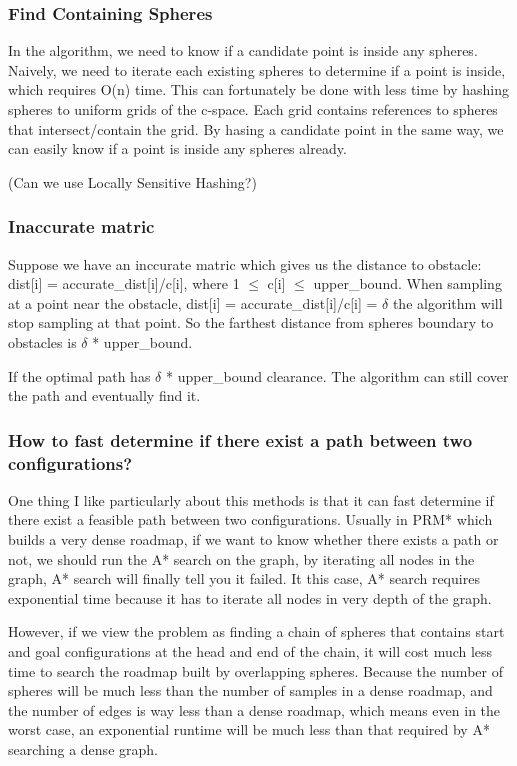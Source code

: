 \documentclass{article}
\begin{document}
 		\subsubsection{Find Containing Spheres}
 			In the algorithm, we need to know if a candidate point is inside any spheres. Naively, we need to iterate each existing spheres to determine if a point is inside, which requires O(n) time. This can fortunately be done with less time by hashing spheres to uniform grids of the c-space. Each grid contains references to spheres that intersect/contain the grid. By hasing a candidate point in the same way, we can easily know if a point is inside any spheres already.

 			(Can we use Locally Sensitive Hashing?)  

 		\subsubsection{Inaccurate matric}
			Suppose we have an inccurate matric which gives us the distance to obstacle:
 			dist[i] = accurate\_dist[i]/c[i], where 1 $\leq$ c[i] $\leq$ upper\_bound. When sampling at a point near the obstacle, dist[i] = accurate\_dist[i]/c[i] = $\delta$ the algorithm will stop sampling at that point. So the farthest distance from spheres boundary to obstacles is $\delta$ * upper\_bound. 

 			If the optimal path has $\delta$ * upper\_bound clearance. The algorithm can still cover the path and eventually find it.

    \subsubsection{How to fast determine if there exist a path between two configurations?}
      One thing I like particularly about this methods is that it can fast determine if there exist a feasible path between two configurations. Usually in PRM* which builds a very dense roadmap, if we want to know whether there exists a path or not, we should run the A* search on the graph, by iterating all nodes in the graph, A* search will finally tell you it failed. It this case, A* search requires exponential time because it has to iterate all nodes in very depth of the graph. 

      However, if we view the problem as finding a chain of spheres that contains start and goal configurations at the head and end of the chain, it will cost much less time to search the roadmap built by overlapping spheres. Because the number of spheres will be much less than the number of samples in a dense roadmap, and the number of edges is way less than a dense roadmap, which means even in the worst case, an exponential runtime will be much less than that required by A* searching a dense graph. 
   
\end{document}
